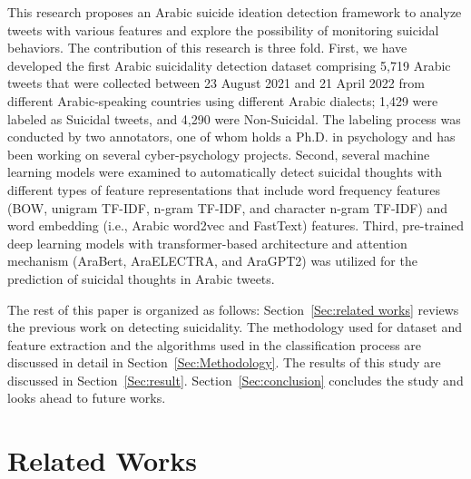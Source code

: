 \documentclass[sn-mathphys,Numbered]{sn-jnl}%
\begin{document}
This research proposes an Arabic suicide ideation detection framework to analyze tweets with various features and explore the possibility of monitoring suicidal behaviors. The contribution of this research is three fold. First, we have developed the first Arabic suicidality detection dataset comprising 5,719 Arabic tweets that were collected between 23 August 2021 and 21 April 2022 from different Arabic-speaking countries using different Arabic dialects; 1,429 were labeled as Suicidal tweets, and 4,290 were Non-Suicidal. The labeling process was conducted by two annotators, one of whom holds a Ph.D. in psychology and has been working on several cyber-psychology projects. %
Second, several machine learning models were examined to automatically detect suicidal thoughts with different types of feature representations that include word frequency features (BOW, unigram TF-IDF, n-gram TF-IDF, and character n-gram TF-IDF) and word embedding (i.e., Arabic word2vec and FastText) features. Third, pre-trained deep learning models with transformer-based architecture and attention mechanism (AraBert, AraELECTRA, and AraGPT2) was utilized for the prediction of suicidal thoughts in Arabic tweets.%



    The rest of this paper is organized as follows: Section{~\ref{Sec:related works}} reviews the previous work on detecting suicidality. The methodology used for dataset and feature extraction and the algorithms used in the classification process are discussed in detail in Section~{\ref{Sec:Methodology}}. The results of this study are discussed in Section~{\ref{Sec:result}}. Section~{\ref{Sec:conclusion}} concludes the study and looks ahead to future works.%

\section{Related Works}
~\label{Sec:related works} 
\end{document}
